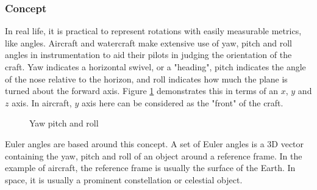 \documentclass[12pt, a4paper]{article}
\begin{document}
\subsubsection{Concept}
In real life, it is practical to represent rotations with easily measurable
metrics, like angles. Aircraft and watercraft make extensive use of yaw, pitch
and roll angles in instrumentation to aid their pilots in judging the
orientation of the craft. Yaw indicates a horizontal swivel, or a "heading",
pitch indicates the angle of the nose relative to the horizon, and roll
indicates how much the plane is turned about the forward axis. Figure
\ref{yawpitchroll} demonstrates this in terms of an $x$, $y$ and $z$ axis. In
aircraft, $y$ axis here can be considered as the "front" of the craft. \\

\begin{figure}[H]
    \centering
    \caption{Yaw pitch and roll}
    \label{yawpitchroll}
\end{figure}

Euler angles are based around this concept. A set of Euler angles is a 3D vector
containing the yaw, pitch and roll of an object around a reference frame. In the
example of aircraft, the reference frame is usually the surface of the Earth. In
space, it is usually a prominent constellation or celestial object. \\
\end{document}
